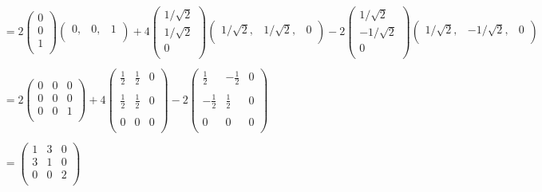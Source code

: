 \documentclass[11pt,a4paper]{article}
\theoremstyle{definition}
\begin{document}
\begin{align*}
& = 2 \begin{pmatrix}
0\\
0\\
1\\
\end{pmatrix}\begin{pmatrix}
0, & 0, & 1\\
\end{pmatrix}
+ 4 \begin{pmatrix}
1/\sqrt{2}\\
1/\sqrt{2}\\
0\\
\end{pmatrix}\begin{pmatrix}
1/\sqrt{2}, & 1/\sqrt{2}, & 0\\
\end{pmatrix} -2 \begin{pmatrix}
1/\sqrt{2}\\
-1/\sqrt{2}\\
0\\
\end{pmatrix}\begin{pmatrix}
1/\sqrt{2}, & -1/\sqrt{2}, & 0\\
\end{pmatrix}\\\\
& = 2\begin{pmatrix}
0 & 0 & 0\\
0 & 0 & 0\\
0 & 0 & 1\\
\end{pmatrix} +4\begin{pmatrix}
\frac{1}{2} & \frac{1}{2} & 0\\\\
\frac{1}{2} & \frac{1}{2} & 0\\\\
  0          &     0        & 0\\
\end{pmatrix}-2\begin{pmatrix}
\frac{1}{2} & -\frac{1}{2} & 0\\\\
-\frac{1}{2} & \frac{1}{2} & 0\\\\
    0        &     0         & 0\\
\end{pmatrix}\\\\
& = \begin{pmatrix}
1 & 3 & 0\\
3 & 1 & 0\\
0 & 0 & 2\\
\end{pmatrix}\\\\
\end{align*}
\end{document}
